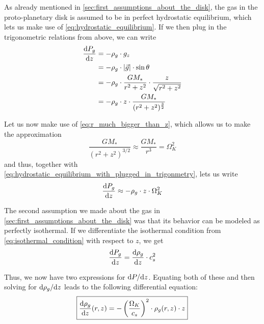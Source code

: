         As already mentioned in \cref{sec:first_assumptions_about_the_disk}, the gas in the 
        proto-planetary disk is assumed to be in perfect hydrostatic equilibrium, which lets us 
        make use of \cref{eq:hydrostatic_equilibrium}. If we then plug in the trigonometric 
        relations from above, we can write
        \begin{align}
            \frac{\text{d} P_g}{\text{d} z}
                &= -\rho_g \cdot g_z \\
                &= -\rho_g \cdot |\vec g| \cdot \sin\theta \\
                &= -\rho_g \cdot \frac{GM_*}{r^2+z^2} \cdot\frac{z}{\sqrt{r^2+z^2}} \\
                &= -\rho_g \cdot z \cdot\frac{GM_*}{ (r^2+z^2)^{\frac{3}{2}} }
                \label{eq:hydrostatic_equilibrium_with_plugged_in_trigonmetry}
        \end{align}

        Let us now make use of \cref{eq:r_much_bigger_than_z}, which allows us to make 
        the approximation
        \begin{equation}
            \frac{GM_*}{(r^2+z^2)^{3/2}} \approx \frac{GM_*}{r^3} = \Omega_K^2
        \end{equation}
        and thus, together with \cref{eq:hydrostatic_equilibrium_with_plugged_in_trigonmetry},
        lets us write
        \begin{equation}
            \frac{\text{d} P_g}{\text{d} z} \approx -\rho_g \cdot z \cdot \Omega_K^2
        \end{equation}

        

        The second assumption we made about the gas in \cref{sec:first_assumptions_about_the_disk}
        was that its behavior can be modeled as perfectly isothermal. If we differentiate the 
        isothermal condition from 
        \cref{eq:isothermal_condition} with respect to $z$, we get
        \begin{equation}
            \frac{\text{d} P_g}{\text{d} z} = \frac{\text{d} \rho_g}{\text{d} z}\cdot c_s^2
        \end{equation}

        Thus, we now have two expressions for $\text dP/\text dz$. Equating both of these and then 
        solving for $\text d\rho_g/\text dz$ leads to the following differential equation:
        \begin{equation}
            \boxed{
                \frac{\text{d} \rho_g}{\text{d} z}(r,z) 
                = -\left(\frac{\Omega_K}{c_s}\right)^2 \cdot \rho_g(r,z) \cdot z
            }
        \end{equation}


